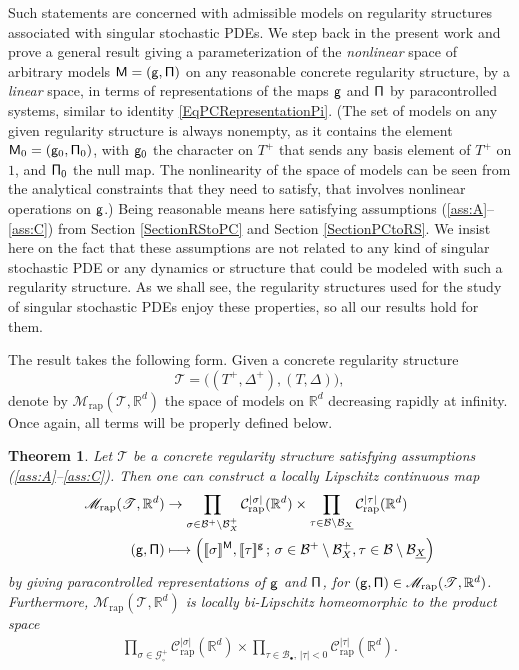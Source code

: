 \documentclass[JEP,XML,SOM,Unicode,published]{cedram}
\newcommand\mto{\mathchoice{\longmapsto}{\mapsto}{\mapsto}{\mapsto}}
\newcommand{\sbullet}{{\scriptscriptstyle\bullet}}
\theoremstyle{plain}
\newtheorem{thm}{Theorem}
\theoremstyle{definition}
\newcommand{\Brac}[1]{[\![#1]\!]}
\newcommand{\rap}{\mathrm{rap}}
\newcommand{\scrM}{\mathscr{M}}
\newcommand{\scrT}{\mathscr{T}}
\newcommand{\bbR}{\mathbb{R}}
\newcommand{\mcB}{\mathcal{B}}
\newcommand{\mcC}{\mathcal{C}}
\newcommand{\mcG}{\mathcal{G}}
\begin{document}
Such statements are concerned with admissible models on regularity structures associated with singular stochastic PDEs. We step back in the present work and prove a general result giving a parameterization of the \emph{nonlinear} space of arbitrary models $\sf M=(g,\Pi)$ on any reasonable concrete regularity structure, by a \emph{linear} space, in terms of representations of the maps $\sf g$ and $\sf \Pi$ by paracontrolled systems, similar to identity \eqref{EqPCRepresentationPi}. (The set of models on any given regularity structure is always nonempty, as it contains the element ${\sf M}_0 = ({\sf g}_0, {\sf \Pi}_0)$, with ${\sf g}_0$ the character on $T^+$ that sends any basis element of $T^+$ on $1$, and ${\sf \Pi}_0$ the null map. The nonlinearity of the space of models can be seen from the analytical constraints that they need to satisfy, that involves nonlinear operations on $\sf g$.) Being reasonable means here satisfying assumptions \hbox{(\ref{ass:A}--\ref{ass:C})} from Section \ref{SectionRStoPC} and Section \ref{SectionPCtoRS}. We insist here on the fact that these assumptions are not related to any kind of singular stochastic PDE or any dynamics or structure that could be modeled with such a regularity structure. As we shall see, the regularity structures used for the study of singular stochastic PDEs enjoy these properties, so all our results hold for them.

The result takes the following form. Given a concrete regularity structure
\[
\scrT=\bigl((T^+,\Delta^+), (T,\Delta)\bigr),
\]
denote by $\scrM_\rap(\scrT, \bbR^d)$ the space of models on $\bbR^d$ decreasing rapidly at infinity. Once again, all terms will be properly defined below.

\begin{thm}\label{mainthm1}
Let $\scrT$ be a concrete regularity structure satisfying assumptions \textup{(\ref{ass:A}--\ref{ass:C})}. Then one can construct a locally Lipschitz continuous map
\begin{equation} \begin{split} \label{EqMapModelsToRemainders}
\scrM_\rap(\scrT, \bbR^d) &\to
\prod_{\sigma\in\mcB^+\setminus\mcB_X^+} \mcC_\rap^{|\sigma|}(\bbR^d) \times \prod_{\tau\in\mcB\setminus\mcB_{\underline{X}}} \mcC_\rap^{|\tau|}(\bbR^d) \\
{\sf (g,\Pi)} &\mto \Bigl(\Brac{\sigma}^{\sf M}, \Brac{\tau}^{\sf g}\,;\, \sigma\in\mcB^+\setminus\mcB_X^+, \tau\in\mcB\setminus\mcB_{\underline{X}} \Bigr)
\end{split} \end{equation}
by giving paracontrolled representations of $\sf g$ and $\sf \Pi$, for $({\sf g}, {\sf \Pi})\in \scrM_\rap(\scrT, \bbR^d)$. Furthermore, $\scrM_\rap(\scrT, \bbR^d)$ is locally bi-Lipschitz homeomorphic to the product space
\begin{align} \label{EqParametrizationThm1}
\prod_{\sigma\in\mcG_\circ^+} \mcC_\rap^{|\sigma|}(\bbR^d) \times \prod_{\tau\in\mcB_\sbullet,\,|\tau|<0} \mcC_\rap^{|\tau|}(\bbR^d).
\end{align}
\end{thm}
\end{document}
